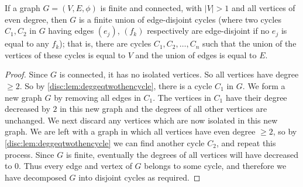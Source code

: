\documentclass[10pt, a4paper]{article}
\begin{document}
\begin{lemma}
    If a graph $G = (V, E, \phi)$ is finite and connected,
    with $|V| > 1$ and all vertices of even degree,
    then $G$ is a finite union of edge-disjoint cycles
    (where two cycles $C_1, C_2$ in $G$ having edges $(e_j)$,
    $(f_k)$ respectively are edge-disjoint if no $e_j$ is equal to any $f_k$);
    that is,
    there are cycles $C_1, C_2, \dotsc, C_n$ such that the union of the vertices of these cycles is equal to $V$ and the union of edges is equal to $E$.
    
    \begin{proof}
        Since $G$ is connected,
        it has no isolated vertices.
        So all vertices have degree $\geq 2$.
        So by \autoref{disc:lem:deggeqtwothencycle},
        there is a cycle $C_1$ in $G$.
        We form a new graph $G$ by removing all edges in $C_1$.
        The vertices in $C_1$ have their degree decreased by $2$ in this new graph and the degrees of all other vertices are unchanged.
        We next discard any vertices which are now isolated in this new graph.
        We are left with a graph in which all vertices have even degree $\geq 2$,
        so by \autoref{disc:lem:deggeqtwothencycle} we can find another cycle $C_2$,
        and repeat this process.
        Since $G$ is finite,
        eventually the degrees of all vertices will have decreased to $0$.
        Thus every edge and vertex of $G$ belongs to some cycle,
        and therefore we have decomposed $G$ into disjoint cycles as required.
    \end{proof}
\end{lemma}
\end{document}
